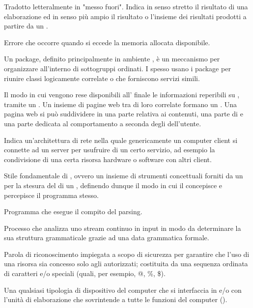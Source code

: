 {Tradotto letteralmente in "messo fuori". Indica in senso stretto il risultato di una elaborazione ed in senso più ampio il risultato o l'insieme dei risultati prodotti a partire da un .}

{Errore che occorre quando si eccede la memoria allocata disponibile.}




{Un package, definito principalmente in ambiente , è un meccanismo per organizzare  all'interno di sottogruppi ordinati. I  spesso usano i package per riunire classi logicamente correlate o che forniscono servizi simili.}

{Il modo in cui vengono rese disponibili all' finale le informazioni reperibili su , tramite un  . Un insieme di pagine web tra di loro correlate formano un . Una pagina web si può suddividere in una parte relativa ai contenuti, una parte di  e una parte dedicata al comportamento a seconda degli  dell'utente.}

{Indica un'architettura di rete nella quale genericamente un computer client si connette ad un server per usufruire di un certo servizio, ad esempio la condivisione di una certa risorsa hardware o software con altri client.}

{Stile fondamentale di , ovvero un insieme di strumenti concettuali forniti da un  per la stesura del  di un , definendo dunque il modo in cui il  concepisce e percepisce il programma stesso.}

{Programma che esegue il compito del parsing.}

{Processo che analizza uno stream continuo in input in modo da determinare la sua struttura grammaticale grazie ad una data grammatica formale.}

{Parola di riconoscimento impiegata a scopo di sicurezza per garantire che l'uso di una risorsa sia concesso solo agli  autorizzati; costituita da una sequenza ordinata di caratteri  e/o speciali (quali, per esempio, @, \%, \$).}

{Una qualsiasi tipologia di dispositivo  del computer che si interfaccia in  e/o  con l'unità di elaborazione che sovrintende a tutte le funzioni del computer ().}

